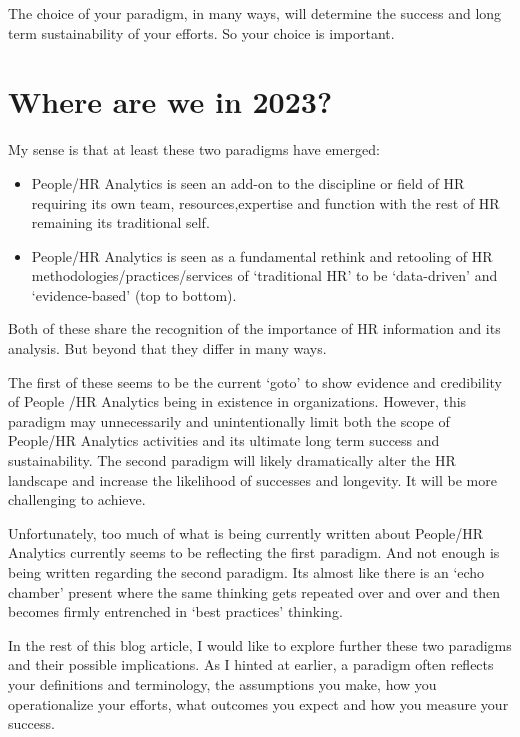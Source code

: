 \documentclass[12pt,letterpaper]{article}
\begin{document}
The choice of your paradigm, in many ways, will determine the success
and long term sustainability of your efforts. So your choice is
important.

\section{Where are we in 2023?}\label{where-are-we-in-2023}

My sense is that at least these two paradigms have emerged:

\begin{itemize}
\item
  People/HR Analytics is seen an add-on to the discipline or field of HR
  requiring its own team, resources,expertise and function with the rest
  of HR remaining its traditional self.
\item
  People/HR Analytics is seen as a fundamental rethink and retooling of
  HR methodologies/practices/services of `traditional HR' to be
  `data-driven' and `evidence-based' (top to bottom).
\end{itemize}

Both of these share the recognition of the importance of HR information
and its analysis. But beyond that they differ in many ways.

The first of these seems to be the current `goto' to show evidence and
credibility of People /HR Analytics being in existence in organizations.
However, this paradigm may unnecessarily and unintentionally limit both
the scope of People/HR Analytics activities and its ultimate long term
success and sustainability. The second paradigm will likely dramatically
alter the HR landscape and increase the likelihood of successes and
longevity. It will be more challenging to achieve.

Unfortunately, too much of what is being currently written about
People/HR Analytics currently seems to be reflecting the first paradigm.
And not enough is being written regarding the second paradigm. Its
almost like there is an `echo chamber' present where the same thinking
gets repeated over and over and then becomes firmly entrenched in `best
practices' thinking.

In the rest of this blog article, I would like to explore further these
two paradigms and their possible implications. As I hinted at earlier, a
paradigm often reflects your definitions and terminology, the
assumptions you make, how you operationalize your efforts, what outcomes
you expect and how you measure your success.
\end{document}
